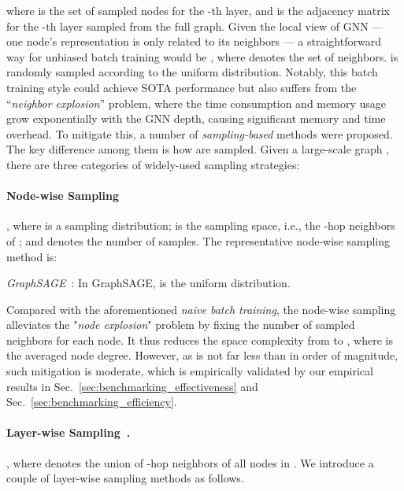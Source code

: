 \message{ !name(main.tex)}\documentclass{article}
\begin{document}
where  is the set of sampled nodes for the -th layer, and  is the adjacency matrix for the -th layer sampled from the full graph. Given the local view of GNN --- one node's representation is only related to its neighbors --- a straightforward way for unbiased batch training would be , where  denotes the set of neighbors.  is randomly sampled according to the uniform distribution. Notably, this batch training style could achieve SOTA performance but also suffers from the ``\textit{neighbor explosion}'' problem, where the time consumption and memory usage grow exponentially with the GNN depth, causing significant memory and time overhead. To mitigate this, a number of \textit{sampling-based} methods were proposed. The key difference among them is how  are sampled. Given a large-scale graph , there are three categories of widely-used sampling strategies:

\vspace{-2mm}
\paragraph{Node-wise Sampling~\cite{hamilton2017inductive}}\label{sec:node_wise_sampling.}
, where  is a sampling distribution;  is the sampling space, i.e., the -hop neighbors of ; and  denotes the number of samples. The representative node-wise sampling method is:

 \textit{GraphSAGE}~\citep{hamilton2017inductive}: In GraphSAGE,  is the uniform distribution.

Compared with the aforementioned \textit{naive batch training}, the node-wise sampling~\citep{hamilton2017inductive} alleviates the "\textit{node explosion}" problem by fixing the number of sampled neighbors  for each node. It thus reduces the space complexity from  to , where  is the averaged node degree. However, as  is not far less than  in order of magnitude, such mitigation is moderate, which is empirically validated by our empirical results in Sec.~\ref{sec:benchmarking_effectiveness} and Sec.~\ref{sec:benchmarking_efficiency}.

\vspace{-2mm}
\paragraph{Layer-wise Sampling~\cite{chen2018fastgcn,zou2019layer}.}\label{sec:layer_wise_sampling}
, where  denotes the union of -hop neighbors of all nodes in .  We introduce a couple of layer-wise sampling methods as follows.
\end{document}
